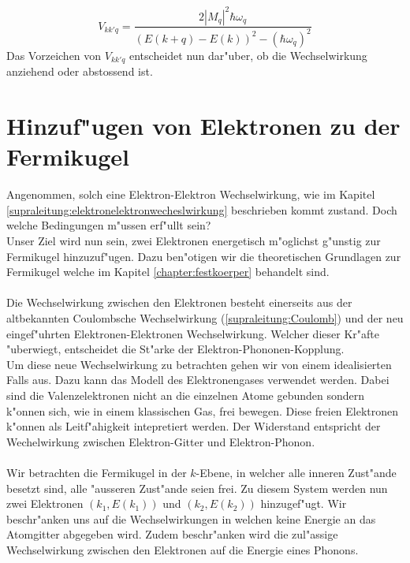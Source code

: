 \begin{refsection}
\begin{equation}
V_{kk'q} =
\frac
{2|M_q|^2\hbar\omega_q}
{(E(k+q)-E(k))^2-(\hbar\omega_q)^2}
\label{supraleitung:Wechelwirkung_Vkk'q_Kurz}
\end{equation}
Das Vorzeichen von $V_{kk'q}$ entscheidet nun dar"uber, ob die Wechselwirkung anziehend oder abstossend ist.\\


\section{Hinzuf"ugen von Elektronen zu der Fermikugel}
Angenommen, solch eine Elektron-Elektron Wechselwirkung, wie im Kapitel \ref{supraleitung:elektronelektronwecheslwirkung} beschrieben kommt zustand. Doch welche Bedingungen m"ussen erf"ullt sein?
\\
Unser Ziel wird nun sein, zwei Elektronen energetisch m"oglichst g"unstig zur Fermikugel hinzuzuf"ugen. Dazu ben"otigen wir die theoretischen Grundlagen zur Fermikugel welche im Kapitel \ref{chapter:festkoerper} behandelt sind.
\\
\\
Die Wechselwirkung zwischen den Elektronen besteht einerseits aus der altbekannten Coulombsche Wechselwirkung (\ref{supraleitung:Coulomb}) und der neu eingef"uhrten Elektronen-Elektronen Wechselwirkung. Welcher dieser Kr"afte "uberwiegt, entscheidet die St"arke der Elektron-Phononen-Kopplung.
\\
Um diese neue Wechselwirkung zu betrachten gehen wir von einem idealisierten Falls aus. Dazu kann das Modell des Elektronengases verwendet werden. Dabei sind die Valenzelektronen nicht an die einzelnen Atome gebunden sondern k"onnen sich, wie in einem klassischen Gas, frei bewegen. Diese freien Elektronen k"onnen als Leitf"ahigkeit intepretiert werden. Der Widerstand entspricht der Wechelwirkung zwischen Elektron-Gitter und Elektron-Phonon.
\\
\\
Wir betrachten die Fermikugel in der $k$-Ebene, in welcher alle inneren Zust"ande besetzt sind, alle "ausseren Zust"ande seien frei. Zu diesem System werden nun zwei Elektronen $(k_1,E(k_1))$ und $(k_2,E(k_2))$ hinzugef"ugt. Wir beschr"anken uns auf die Wechselwirkungen in welchen keine Energie an das Atomgitter abgegeben wird. Zudem beschr"anken wird die zul"assige Wechselwirkung zwischen den Elektronen auf die Energie eines Phonons.


\end{refsection}
